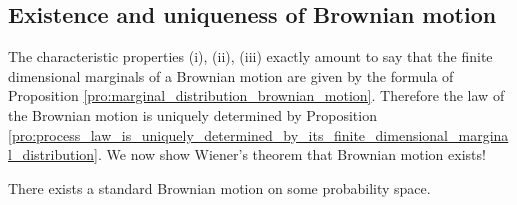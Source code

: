 \subsection{Existence and uniqueness of Brownian motion}

The characteristic properties (i), (ii), (iii) exactly amount to say that the finite dimensional marginals of a Brownian motion are given by the formula of Proposition \ref{pro:marginal_distribution_brownian_motion}. Therefore the law of the Brownian motion is uniquely determined by Proposition \ref{pro:process_law_is_uniquely_determined_by_its_finite_dimensional_marginal_distribution}. We now show Wiener's theorem that Brownian motion exists!

\begin{theorem}\label{thm:wiener_brownian_motion_existence}
There exists a standard Brownian motion on some probability space.
\end{theorem}

